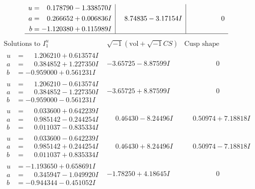 \documentclass[1p]{elsarticle_modified}
\theoremstyle{definition}
\newcommand{\I}{\sqrt{-1}}
\begin{document}
$$\begin{array}{c|c|c}
\begin{aligned}
u &= \phantom{-}0.178790 - 1.338570 I \\
a &= \phantom{-}0.266652 + 0.006836 I \\
b &= -1.120380 + 0.115989 I\end{aligned}
 & \phantom{-}8.74835 - 3.17154 I & \phantom{-0.000000 } 0\\
 \hline 
 \end{array}$$\newpage$$\begin{array}{c|c|c}  
\text{Solutions to }I^u_{1}& \I (\text{vol} + \sqrt{-1}CS) & \text{Cusp shape}\\
 \hline 
\begin{aligned}
u &= \phantom{-}1.206210 + 0.613574 I \\
a &= \phantom{-}0.384852 + 1.227350 I \\
b &= -0.959000 + 0.561231 I\end{aligned}
 & -3.65725 - 8.87599 I & \phantom{-0.000000 } 0 \\ \hline\begin{aligned}
u &= \phantom{-}1.206210 - 0.613574 I \\
a &= \phantom{-}0.384852 - 1.227350 I \\
b &= -0.959000 - 0.561231 I\end{aligned}
 & -3.65725 + 8.87599 I & \phantom{-0.000000 } 0 \\ \hline\begin{aligned}
u &= \phantom{-}0.033600 + 0.642239 I \\
a &= \phantom{-}0.985142 - 0.244254 I \\
b &= \phantom{-}0.011037 - 0.835334 I\end{aligned}
 & \phantom{-}0.46430 - 8.24496 I & \phantom{-}0.50974 + 7.18818 I \\ \hline\begin{aligned}
u &= \phantom{-}0.033600 - 0.642239 I \\
a &= \phantom{-}0.985142 + 0.244254 I \\
b &= \phantom{-}0.011037 + 0.835334 I\end{aligned}
 & \phantom{-}0.46430 + 8.24496 I & \phantom{-}0.50974 - 7.18818 I \\ \hline\begin{aligned}
u &= -1.193650 + 0.658691 I \\
a &= \phantom{-}0.345947 - 1.049920 I \\
b &= -0.944344 - 0.451052 I\end{aligned}
 & -1.78250 + 4.18645 I & \phantom{-0.000000 } 0 \\ \hline\begin{aligned}

\end{aligned}
\end{array}$$
\end{document}
